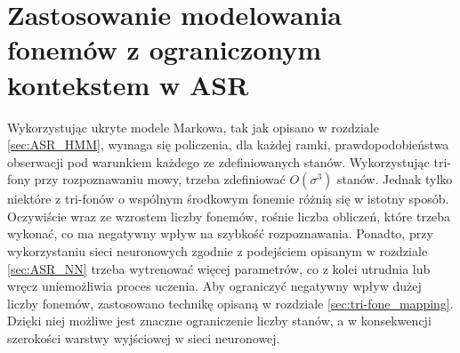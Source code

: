 \documentclass[shortabstract, mgr]{iithesis}
\begin{document}
\section{ Zastosowanie modelowania fonemów z ograniczonym kontekstem w ASR }	
	Wykorzystując ukryte modele Markowa, tak jak opisano w rozdziale \ref{sec:ASR_HMM}, wymaga się policzenia, dla każdej ramki, prawdopodobieństwa obserwacji pod warunkiem każdego ze zdefiniowanych stanów. Wykorzystując tri-fony przy rozpoznawaniu mowy, trzeba zdefiniować $O(\sigma^3)$ stanów. Jednak tylko niektóre z tri-fonów o wspólnym środkowym fonemie różnią się w istotny sposób. Oczywiście wraz ze wzrostem liczby fonemów, rośnie liczba obliczeń, które trzeba wykonać, co ma negatywny wpływ na szybkość rozpoznawania. Ponadto, przy wykorzystaniu sieci neuronowych zgodnie z podejściem opisanym w rozdziale \ref{sec:ASR_NN} trzeba wytrenować więcej parametrów, co z kolei utrudnia lub wręcz uniemożliwia proces uczenia. Aby ograniczyć negatywny wpływ dużej liczby fonemów, zastosowano technikę opisaną w rozdziale \ref{sec:tri-fone_mapping}. Dzięki niej możliwe jest znaczne ograniczenie liczby stanów, a w konsekwencji szerokości warstwy wyjściowej w sieci neuronowej.
	
\end{document}
